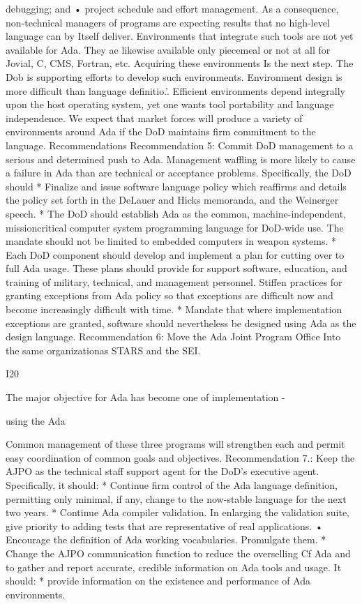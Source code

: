 \documentclass[12pt]{article}
\begin{document}
debugging; and
• project schedule and effort management.
As a consequence, non-technical managers of programs are expecting results
that no high-level language can by Itself deliver.
Environments that integrate such tools are not yet available for Ada. They ae likewise
available only piecemeal or not at all for Jovial, C, CMS, Fortran, etc.
Acquiring these environments Is the next step.
The Dob is supporting efforts to develop such environments. Environment design is
more difficult than language definitio.'. Efficient environments depend integrally upon the
host operating system, yet one wants tool portability and language independence. We
expect that market forces will produce a variety of environments around Ada if the DoD
maintains firm commitment to the language.
Recommendations
Recommendation 5: Commit DoD management to a serious and determined
push to Ada.
Management waffling is more likely to cause a failure in Ada than are technical or
acceptance problems.
Specifically, the DoD should
* Finalize and issue software language policy which reaffirms and details the policy set
forth in the DeLauer and Hicks memoranda, and the Weinerger speech.
* The DoD should establish Ada as the common, machine-independent, missioncritical computer system programming language for DoD-wide use. The mandate
should not be limited to embedded computers in weapon systems.
* Each DoD component should develop and implement a plan for cutting over to
full Ada usage. These plans should provide for support software, education, and
training of military, technical, and management personnel.
Stiffen practices for granting exceptions from Ada policy so that exceptions are difficult
now and become increasingly difficult with time.
* Mandate that where implementation exceptions are granted, software should nevertheless be designed using Ada as the design language.
Recommendation 6: Move the Ada Joint Program Office Into the same
organizationas STARS and the SEI.

I20

The major objective for Ada has become one of implementation -

using the Ada

Common management of these three programs will strengthen each and permit easy
coordination of common goals and objectives.
Recommendation 7.: Keep the AJPO as the technical staff support agent
for the DoD's executive agent.
Specifically, it should:
* Continue firm control of the Ada language definition, permitting only minimal, if any,
change to the now-stable language for the next two years.
* Continue Ada compiler validation. In enlarging the validation suite, give priority to
adding tests that are representative of real applications.
• Encourage the definition of Ada working vocabularies. Promulgate them.
* Change the AJPO communication function to reduce the overselling Cf Ada and to
gather and report accurate, credible information on Ada tools and usage. It should:
* provide information on the existence and performance of Ada
environments.
\end{document}
